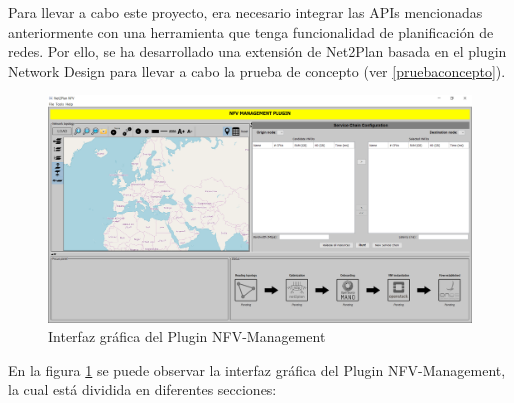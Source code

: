 Para llevar a cabo este proyecto, era necesario integrar las APIs mencionadas anteriormente con una herramienta que tenga funcionalidad de planificación de redes. Por ello, se ha desarrollado una extensión de Net2Plan basada en el plugin Network Design para llevar a cabo la prueba de concepto (ver \ref{pruebaconcepto}). 


\begin{figure}[!ht]
	\centering
	\includegraphics[width=1\linewidth]{imagenes/nfvplugin_dashboard}
	\caption{Interfaz gráfica del Plugin NFV-Management}
	\label{fig:nfvplugindash}
\end{figure}

En la figura \ref{fig:nfvplugindash} se puede observar la interfaz gráfica del Plugin NFV-Management, la cual está dividida en diferentes secciones:

